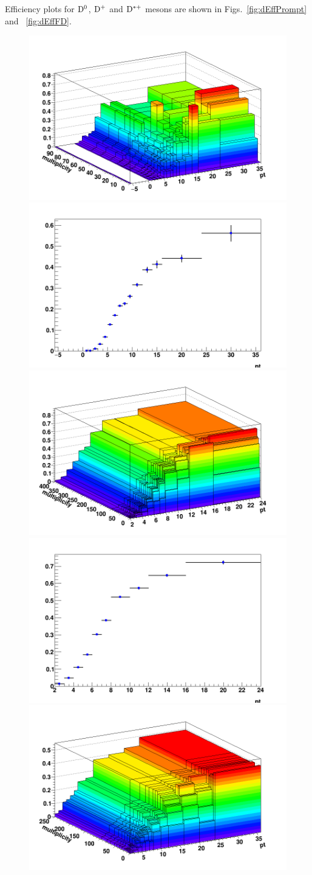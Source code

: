 Efficiency plots for ${\rm D^0}$, ${\rm D^+}$ and ${\rm D^{*+}}$ mesons are shown in Figs.~\ref{fig:dEffPrompt} and ~\ref{fig:dEffFD}.

\begin{figure}[!htp]     %
	\centering
    \includegraphics[width=.48\linewidth]{figures/Effs/EfficiencyMap_2D_DPlus_c_Ref_wLimAcc_Plot.png}
	\includegraphics[width=.48\linewidth]{figures/Effs/EfficiencyMap_1D_DPlus_c_Ref_wLimAcc_Plot.png}  %
	\includegraphics[width=.48\linewidth]{figures/Effs/EfficiencyMap_2D_DStar_c_Ref_wLimAcc_Plot.png}
	\includegraphics[width=.48\linewidth]{figures/Effs/EfficiencyMap_1D_DStar_c_Ref_wLimAcc_Plot.png}  %
	\includegraphics[width=.48\linewidth]{figures/Effs/EfficiencyMap_2D_Dzero_c_RefPtBins_wLimAcc_Plot.png}

\end{figure}
